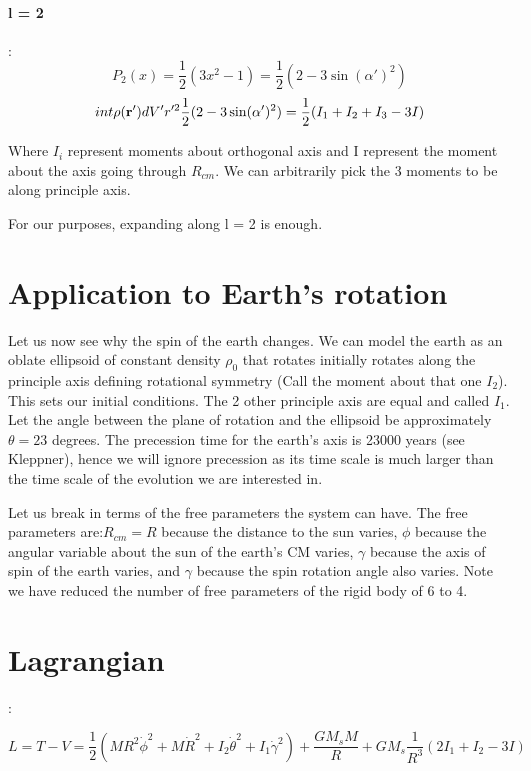 \documentclass[12pt]{article}
\begin{document}
\paragraph{l = 2}: \begin{equation}
    P_2(x) = \frac{1}{2} (3 x^2 -1) = \frac{1}{2}(2- 3\sin(\alpha')^2)
\end{equation}
\begin{equation}
    int \rho({\bf r'})dV' r'^2 \frac{1}{2}(2-3\sin(\alpha')^2) = \frac{1}{2}(I_1 + I_2 + I_3 - 3I)
\end{equation}

Where $I_i$ represent moments about orthogonal axis and I represent the moment about the axis going through $R_{cm}$.  We can arbitrarily pick the 3 moments to be along principle axis.

For our purposes, expanding along l = 2 is enough.

\section{Application to Earth's rotation}

Let us now see why the spin of the earth changes.  We can model the earth as an oblate ellipsoid 
of constant density $\rho_0$ that rotates initially rotates along the principle axis defining rotational symmetry 
(Call the moment about that one $I_2$).  
This sets our initial conditions. The 2 other principle axis are equal and called $I_1$.  
Let the angle between the plane of rotation and the ellipsoid be approximately $\theta = 23$ degrees.  
The precession time for the earth's axis is 23000 years (see Kleppner), hence we will ignore precession as its time scale is much larger than the time scale of the evolution we are interested in.

\noindent  Let us break in terms of the free parameters the system can have.  The free parameters are:$R_{cm} = R$ because the distance to the sun varies, $\phi$ because the angular variable about the sun of the earth's CM varies, $\gamma$ because the axis of spin of the earth varies, and $\gamma$ because the spin rotation angle also varies.  Note we have reduced the number of free parameters of the rigid body of 6 to 4.

\section{Lagrangian}:

\begin{equation}
    L = T- V = \frac{1}{2} \left(MR^2  \dot{\phi}^2 + M \dot{R}^2 + I_2 \dot{\theta}^2 + I_1 \dot{\gamma}^2 \right)+ \frac{GM_sM}{R}+ GM_s \frac{1}{R^3} \left(2I_1 + I_2 - 3I \right)
\end{equation}
\end{document}
